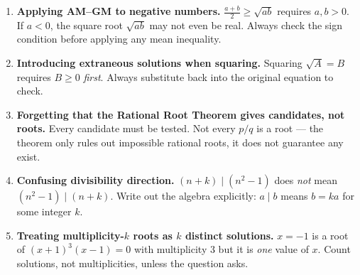\documentclass[11pt,a4paper]{article}
\begin{document}
\begin{enumerate}[leftmargin=2em, itemsep=5pt]
  \item \textbf{Applying AM--GM to negative numbers.}
        $\tfrac{a+b}{2}\geq\sqrt{ab}$ requires $a,b>0$.
        If $a<0$, the square root $\sqrt{ab}$ may not even be real.
        Always check the sign condition before applying any mean inequality. 

  \item \textbf{Introducing extraneous solutions when squaring.}
        Squaring $\sqrt{A}=B$ requires $B\geq0$ \emph{first}.
        Always substitute back into the original equation to check. 

  \item \textbf{Forgetting that the Rational Root Theorem gives candidates, not roots.}
        Every candidate must be tested. Not every $p/q$ is a root --- the theorem only
        rules out impossible rational roots, it does not guarantee any exist. 

  \item \textbf{Confusing divisibility direction.}
        $(n+k)\mid(n^2-1)$ does \emph{not} mean $(n^2-1)\mid(n+k)$.
        Write out the algebra explicitly:
        $a\mid b$ means $b=ka$ for some integer $k$. 

  \item \textbf{Treating multiplicity-$k$ roots as $k$ distinct solutions.}
        $x=-1$ is a root of $(x+1)^3(x-1)=0$ with multiplicity 3 but it is
        \emph{one} value of $x$. Count solutions, not multiplicities, unless the question asks. 
\end{enumerate}

\end{document}
